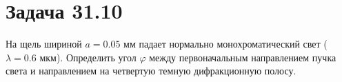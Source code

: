 \section{Задача 31.10}

На щель шириной $a=0.05$ мм падает нормально монохроматический свет ($\lambda=0.6$ мкм). Определить угол $\varphi$ между первоначальным направлением пучка света и направлением на четвертую темную дифракционную полосу.